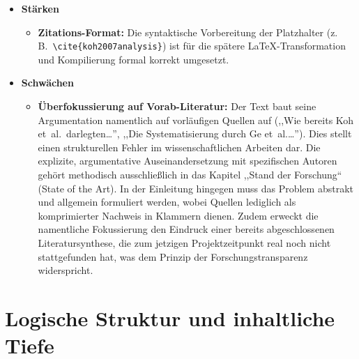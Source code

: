 \documentclass[
  11pt,
  a4paper,
  parskip=half         %
]{scrartcl}
\begin{document}
\begin{itemize}
  \item \textbf{Stärken}
  \begin{itemize}
    \item \textbf{Zitations-Format:} Die syntaktische Vorbereitung der Platzhalter
          (z.\,B.\ \texttt{\textbackslash cite\{koh2007analysis\}}) ist für die spätere
          \LaTeX-Transformation und Kompilierung formal korrekt umgesetzt.
  \end{itemize}

  \item \textbf{Schwächen}
  \begin{itemize}
    \item \textbf{Überfokussierung auf Vorab-Literatur:} Der Text baut seine Argumentation
          namentlich auf vorläufigen Quellen auf (,,Wie bereits Koh et~al.\ darlegten\ldots'',
          ,,Die Systematisierung durch Ge et~al.\ldots''). Dies stellt einen strukturellen
          Fehler im wissenschaftlichen Arbeiten dar. Die explizite, argumentative Auseinandersetzung
          mit spezifischen Autoren gehört methodisch ausschließlich in das Kapitel ,,Stand der Forschung``
          (State of the Art). In der Einleitung hingegen muss das Problem abstrakt und allgemein formuliert
          werden, wobei Quellen lediglich als komprimierter Nachweis in Klammern dienen. Zudem erweckt
          die namentliche Fokussierung den Eindruck einer bereits abgeschlossenen Literatursynthese,
          die zum jetzigen Projektzeitpunkt real noch nicht stattgefunden hat, was dem Prinzip der
          Forschungstransparenz widerspricht.
  \end{itemize}
\end{itemize}

\section{Logische Struktur und inhaltliche Tiefe}
\end{document}
